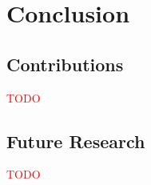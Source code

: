 \chapter{Conclusion}
\label{chap:conclusion}

\section{Contributions}
\textcolor{red}{TODO}

\section{Future Research}
\textcolor{red}{TODO}


